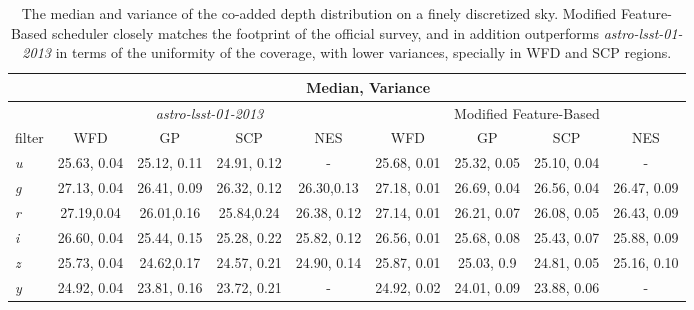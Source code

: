 \documentclass[12pt]{aastex62}
\theoremstyle{definition}
\begin{document}
\begin{table}\label{table_10yrs_hist}
\caption{The median and variance of the co-added depth distribution on a finely discretized sky. Modified Feature-Based scheduler closely matches the footprint of the official survey, and in addition outperforms \textit{astro-lsst-01-2013} in terms of the uniformity of the coverage, with lower variances, specially in WFD and SCP regions.}
\begin{center}
\begin{tabular}{l|cccc|cccc} \hline
&\multicolumn{8}{c}{Median, Variance} \\ \hline
&\multicolumn{4}{c|}{\textit{astro-lsst-01-2013}} &\multicolumn{4}{c}{Modified Feature-Based} \\
filter  & WFD & GP & SCP & NES & WFD & GP & SCP & NES\\
\hline
\textit{u}& 25.63, 0.04 & 25.12, 0.11& 24.91, 0.12& - &25.68, 0.01 &25.32, 0.05 & 25.10, 0.04& -\\
\textit{g}& 27.13, 0.04 & 26.41, 0.09& 26.32, 0.12 & 26.30,0.13& 27.18, 0.01 & 26.69, 0.04&26.56, 0.04 &26.47, 0.09 \\
\textit{r}& 27.19,0.04 & 26.01,0.16& 25.84,0.24 & 26.38, 0.12 & 27.14, 0.01& 26.21, 0.07 & 26.08, 0.05 & 26.43, 0.09\\
\textit{i}& 26.60, 0.04 & 25.44, 0.15 & 25.28, 0.22 & 25.82, 0.12 & 26.56, 0.01 & 25.68, 0.08 & 25.43, 0.07 & 25.88, 0.09\\
\textit{z}& 25.73, 0.04& 24.62,0.17& 24.57, 0.21& 24.90, 0.14 & 25.87, 0.01 & 25.03, 0.9 & 24.81, 0.05 & 25.16, 0.10\\
\textit{y}& 24.92, 0.04 & 23.81, 0.16 & 23.72, 0.21& - & 24.92, 0.02 & 24.01, 0.09 &23.88, 0.06 & -\\
\end{tabular}
\end{center}
\end{table}

\end{document}
